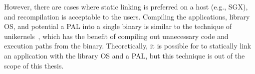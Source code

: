 However, there are cases where static linking is preferred on a host (e.g., SGX), and recompilation is acceptable to the users.
Compiling the applications, library OS, and potential a PAL
into a single binary is similar to the technique of unikernels~\cite{unikernels},
which has the benefit of compiling out unnecessary code and execution paths
from the binary. 
Theoretically, it is possible for \graphene{} to statically link an application with the library OS and a PAL,
but this technique is out of the scope of this thesis.







